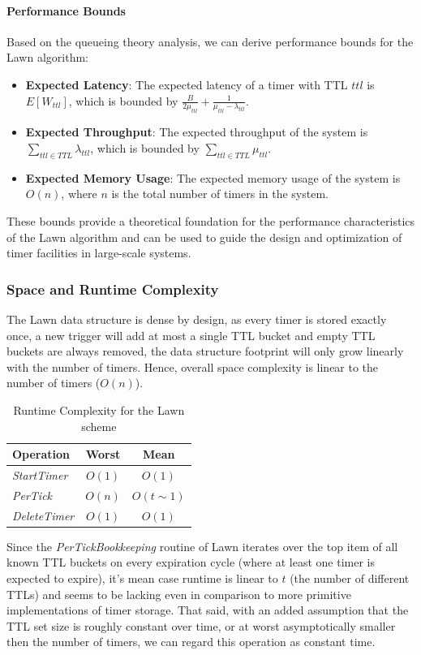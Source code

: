 \documentclass[conference]{IEEEtran}
\newcommand{\complexity}[9]{
\begin{table}[ht]
	\begin{center}
		\begin{tabular}{l|c|c}
			\textbf{Operation} & \textbf{#1} & \textbf{#2} \\
			\hline
			\textit{StartTimer} & $O(#3)$ & $O(#4)$ \\
			\textit{PerTick} & $O(#5)$ & $O(#6)$ \\
			\textit{DeleteTimer} &  $O(#7)$ & $O(#8)$ \\
		\end{tabular}
		\linebreak
		\caption{Runtime Complexity for #9}
	\end{center}
\end{table}
}
\begin{document}
\paragraph{Performance Bounds}
Based on the queueing theory analysis, we can derive performance bounds for the Lawn algorithm:

\begin{itemize}
    \item \textbf{Expected Latency}: The expected latency of a timer with TTL $ttl$ is $E[W_{ttl}]$, which is bounded by $\frac{B}{2\mu_{ttl}} + \frac{1}{\mu_{ttl} - \lambda_{ttl}}$.
    
    \item \textbf{Expected Throughput}: The expected throughput of the system is $\sum_{ttl \in TTL} \lambda_{ttl}$, which is bounded by $\sum_{ttl \in TTL} \mu_{ttl}$.
    
    \item \textbf{Expected Memory Usage}: The expected memory usage of the system is $O(n)$, where $n$ is the total number of timers in the system.
\end{itemize}

These bounds provide a theoretical foundation for the performance characteristics of the Lawn algorithm and can be used to guide the design and optimization of timer facilities in large-scale systems.

\subsubsection{Space and Runtime Complexity}
The Lawn data structure is dense by design, as every timer is stored exactly once, a new trigger will add at most a single TTL bucket and empty TTL buckets are always removed, the data structure footprint will only grow linearly with the number of timers. Hence, overall space complexity is linear to the number of timers ($O(n)$). 

\complexity{Worst}{Mean}{1}{1}{n}{t\sim1}{1}{1}{the Lawn scheme}

Since the \textit{PerTickBookkeeping} routine of Lawn iterates over the top item of all known TTL buckets on every expiration cycle (where at least one timer is expected to expire), it's mean case runtime is linear to $t$ (the number of different TTLs) and seems to be lacking even in comparison to more primitive implementations of timer storage. That said, with an added assumption that the TTL set size is roughly constant over time, or at worst asymptotically smaller then the number of timers, we can regard this operation as constant time.
\end{document}
